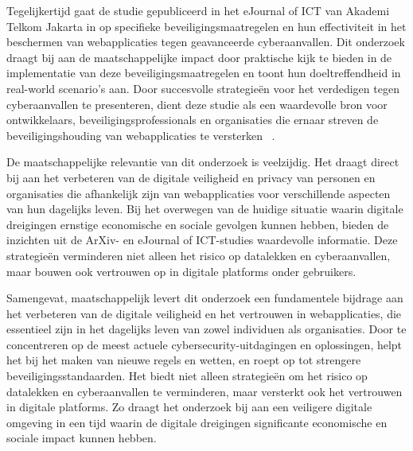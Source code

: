 Tegelijkertijd gaat de studie gepubliceerd in het eJournal of ICT van Akademi Telkom Jakarta in op specifieke beveiligingsmaatregelen en hun effectiviteit in 
het beschermen van webapplicaties tegen geavanceerde cyberaanvallen. Dit onderzoek draagt bij aan de maatschappelijke impact door praktische kijk te 
bieden in de implementatie van deze beveiligingsmaatregelen en toont hun doeltreffendheid in real-world scenario's aan. Door succesvolle strategieën voor het 
verdedigen tegen cyberaanvallen te presenteren, dient deze studie als een waardevolle bron voor ontwikkelaars, beveiligingsprofessionals en organisaties
die ernaar streven de beveiligingshouding van webapplicaties te versterken ~\autocite{OlivianaZabka2023}.

De maatschappelijke relevantie van dit onderzoek is veelzijdig. Het draagt direct bij aan het verbeteren van de digitale veiligheid en privacy van personen 
en organisaties die afhankelijk zijn van webapplicaties voor verschillende aspecten van hun dagelijks leven. Bij het overwegen van de huidige situatie waarin 
digitale dreigingen ernstige economische en sociale gevolgen kunnen hebben, bieden de inzichten uit de ArXiv- en eJournal of ICT-studies waardevolle informatie. Deze strategieën 
verminderen niet alleen het risico op datalekken en cyberaanvallen, maar bouwen ook vertrouwen op in digitale platforms onder gebruikers.

Samengevat, maatschappelijk levert dit onderzoek een fundamentele bijdrage aan het verbeteren van de digitale veiligheid en het vertrouwen in webapplicaties, die essentieel 
zijn in het dagelijks leven van zowel individuen als organisaties. Door te concentreren op de meest actuele cybersecurity-uitdagingen en oplossingen, 
helpt het bij het maken van nieuwe regels en wetten, en roept op tot strengere beveiligingsstandaarden. Het biedt niet alleen strategieën om het risico 
op datalekken en cyberaanvallen te verminderen, maar versterkt ook het vertrouwen in digitale platforms. Zo draagt het onderzoek bij aan een veiligere 
digitale omgeving in een tijd waarin de digitale dreigingen significante economische en sociale impact kunnen hebben.



